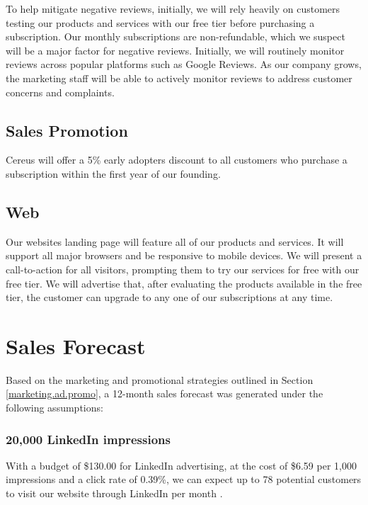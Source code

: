 To help mitigate negative reviews, initially, we will rely heavily on customers testing our products and services with our free tier before purchasing a subscription. Our monthly subscriptions are non-refundable, which we suspect will be a major factor for negative reviews. Initially, we will routinely monitor reviews across popular platforms such as Google Reviews. As our company grows, the marketing staff will be able to actively monitor reviews to address customer concerns and complaints.

\subsection{Sales Promotion}

Cereus will offer a 5\% early adopters discount to all customers who purchase a subscription within the first year of our founding.

\subsection{Web}

Our websites landing page will feature all of our products and services. It will support all major browsers and be responsive to mobile devices. We will present a call-to-action for all visitors, prompting them to try our services for free with our free tier. We will advertise that, after evaluating the products available in the free tier, the customer can upgrade to any one of our subscriptions at any time.
 

\section{Sales Forecast} \label{section.sales.forecast}

Based on the marketing and promotional strategies outlined in Section \ref{marketing.ad.promo}, a 12-month sales forecast was generated under the following assumptions:


\subsubsection*{20,000 LinkedIn impressions}

With a budget of \$130.00 for LinkedIn advertising, at the cost of \$6.59 per 1,000 impressions and a click rate of 0.39\%, we can expect up to 78 potential customers to visit our website through LinkedIn per month \cite{wilcox.2020}.

